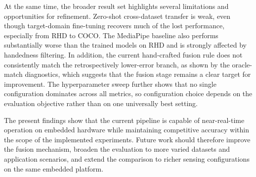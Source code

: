 \documentclass[10pt,letterpaper,twocolumn]{article}
\begin{document}
At the same time, the broader result set highlights several limitations and opportunities for refinement. Zero-shot cross-dataset transfer is weak, even though target-domain fine-tuning recovers much of the lost performance, especially from RHD to COCO. The MediaPipe baseline also performs substantially worse than the trained models on RHD and is strongly affected by handedness filtering. In addition, the current hand-crafted fusion rule does not consistently match the retrospectively lower-error branch, as shown by the oracle-match diagnostics, which suggests that the fusion stage remains a clear target for improvement. The hyperparameter sweep further shows that no single configuration dominates across all metrics, so configuration choice depends on the evaluation objective rather than on one universally best setting.

The present findings show that the current pipeline is capable of near-real-time operation on embedded hardware while maintaining competitive accuracy within the scope of the implemented experiments. Future work should therefore improve the fusion mechanism, broaden the evaluation to more varied datasets and application scenarios, and extend the comparison to richer sensing configurations on the same embedded platform.
\end{document}

